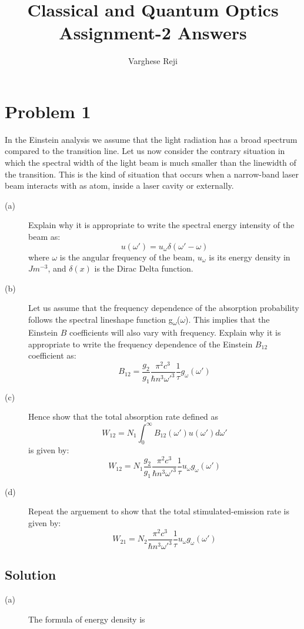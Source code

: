 \documentclass[a4paper,11pt]{article}
\author{Varghese Reji}
\date{}
\title{Classical and Quantum Optics\\\medskip
\large Assignment-2 Answers}
\begin{document}
\maketitle

\section*{Problem 1}
\label{sec:orgcf1d1cb}
In the Einstein analysis we assume that the light radiation has a broad spectrum compared to the transition line. Let us now consider the contrary situation in which the spectral width of the light beam is much smaller than the linewidth of the transition. This is the kind of situation that occurs when a narrow-band laser beam interacts with as atom, inside a laser cavity or externally.
\begin{description}
\item[{(a)}] Explain why it is appropriate to write the spectral energy intensity of the beam as:
$$u(\omega') = u_\omega\delta(\omega'-\omega)$$
where \(\omega\) is the angular frequency of the beam, \(u_\omega\) is its energy density in \(Jm^{-3}\), and \(\delta(x)\) is the Dirac Delta function.
\item[{(b)}] Let us assume that the frequency dependence of the absorption probability follows the spectral lineshape function g\textsubscript{\(\omega\)}(\(\omega\)). This implies that the Einstein \(B\) coefficients will also vary with frequency. Explain why it is appropriate to write the frequency dependence of the Einstein \(B_{12}\) coefficient as:
$$B_{12} = \frac{g_2}{g_1} \frac{\pi^2c^3}{\hbar n^3\omega'^3} \frac{1}{\tau} g_{\omega}(\omega')$$
\item[{(c)}] Hence show that the total absorption rate defined as
$$W_{12} = N_1\int_{0}^{\infty} B_{12}(\omega') u(\omega')d\omega'$$
is given by:
$$W_{12} = N_1 \frac{g_2}{g_1} \frac{\pi^2c^3}{\hbar n^3\omega'^3} \frac{1}{\tau} u_{\omega}g_{\omega}(\omega')$$
\item[{(d)}] Repeat the arguement to show that the total stimulated-emission rate is given by:
$$W_{21} = N_2 \frac{\pi^2c^3}{\hbar n^3\omega'^3} \frac{1}{\tau} u_{\omega}g_{\omega}(\omega')$$
\end{description}
\subsection*{Solution}
\label{sec:org0fa8d77}
\begin{description}
\item[{(a)}] The formula of energy density is
\end{description}
\end{document}
